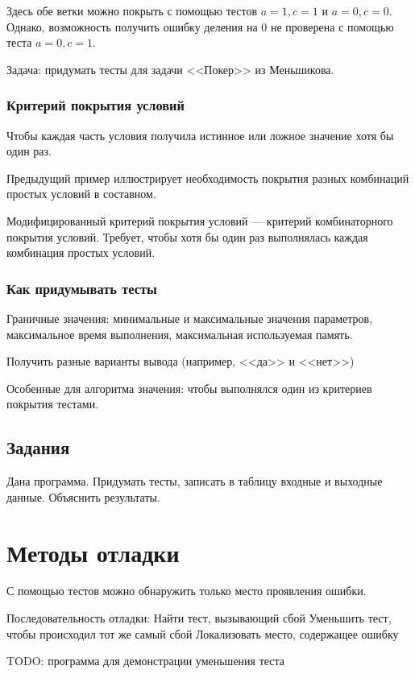 \documentclass[14pt,openany]{book}
\begin{document}
Здесь обе ветки можно покрыть с помощью тестов $a=1, c=1$ и $a=0, c=0$.
Однако, возможность получить ошибку деления на $0$ не проверена с помощью
теста $a=0, c=1$.


Задача: придумать тесты для задачи <<Покер>> из Меньшикова.

\subsection{Критерий покрытия условий}

Чтобы каждая часть условия получила истинное или ложное
значение хотя бы один раз.

Предыдущий пример иллюстрирует необходимость покрытия разных комбинаций простых
условий в составном.

Модифицированный критерий покрытия условий --- критерий комбинаторного покрытия условий.
Требует, чтобы хотя бы один раз выполнялась каждая комбинация простых условий.

\subsection{Как придумывать тесты}

Граничные значения: минимальные и максимальные значения параметров, максимальное время выполнения,
максимальная используемая память.

Получить разные варианты вывода (например, <<да>> и <<нет>>)

Особенные для алгоритма значения: чтобы выполнялся один из критериев покрытия тестами.

\section{Задания}

Дана программа. Придумать тесты, записать в таблицу входные и выходные данные.
Объяснить результаты.



\chapter{Методы отладки}


С помощью тестов можно обнаружить только место проявления ошибки.


Последовательность отладки:
Найти тест, вызывающий сбой
Уменьшить тест, чтобы происходил тот же самый сбой
Локализовать место, содержащее ошибку

TODO: программа для демонстрации уменьшения теста
\end{document}
